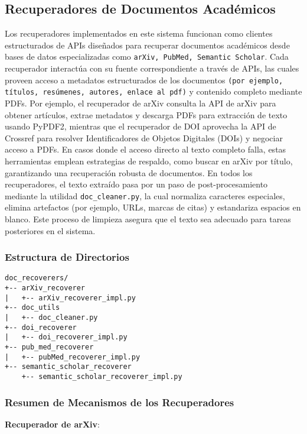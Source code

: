 \documentclass[12pt]{article}
\begin{document}
\subsection{Recuperadores de Documentos Académicos}
Los recuperadores implementados en este sistema funcionan como clientes estructurados de APIs diseñados para recuperar documentos académicos desde bases de datos especializadas como \texttt{arXiv, PubMed, Semantic Scholar}. Cada recuperador interactúa con su fuente correspondiente a través de APIs, las cuales proveen acceso a metadatos estructurados de los documentos \texttt{(por ejemplo, títulos, resúmenes, autores, enlace al pdf)} y contenido completo mediante PDFs. Por ejemplo, el recuperador de arXiv consulta la API de arXiv para obtener artículos, extrae metadatos y descarga PDFs para extracción de texto usando PyPDF2, mientras que el recuperador de DOI aprovecha la API de Crossref para resolver Identificadores de Objetos Digitales (DOIs) y negociar acceso a PDFs. En casos donde el acceso directo al texto completo falla, estas herramientas emplean estrategias de respaldo, como buscar en arXiv por título, garantizando una recuperación robusta de documentos. En todos los recuperadores, el texto extraído pasa por un paso de post-procesamiento mediante la utilidad \texttt{doc\_cleaner.py}, la cual normaliza caracteres especiales, elimina artefactos (por ejemplo, URLs, marcas de citas) y estandariza espacios en blanco. Este proceso de limpieza asegura que el texto sea adecuado para tareas posteriores en el sistema.

\subsubsection{Estructura de Directorios}
\begin{verbatim}
doc_recoverers/
+-- arXiv_recoverer
|   +-- arXiv_recoverer_impl.py
+-- doc_utils
|   +-- doc_cleaner.py
+-- doi_recoverer
|   +-- doi_recoverer_impl.py
+-- pub_med_recoverer
|   +-- pubMed_recoverer_impl.py
+-- semantic_scholar_recoverer
    +-- semantic_scholar_recoverer_impl.py
\end{verbatim}

\subsubsection{Resumen de Mecanismos de los Recuperadores}
    
\textbf{Recuperador de arXiv}:
\end{document}
